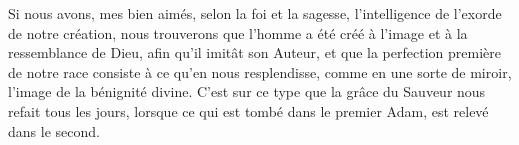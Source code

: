 Si nous avons, mes bien aimés, selon la foi et la sagesse, l’intelligence de l’exorde de notre création, nous trouverons que l’homme a été créé à l’image et à la ressemblance de Dieu, afin qu’il imitât son Auteur, et que la perfection première de notre race consiste à ce qu’en nous resplendisse, comme en une sorte de miroir, l’image de la bénignité divine. C’est sur ce type que la grâce du Sauveur nous refait tous les jours, lorsque ce qui est tombé dans le premier Adam, est relevé dans le second.